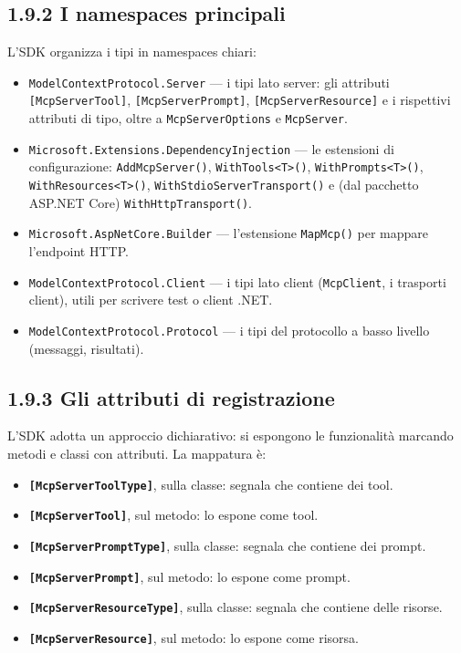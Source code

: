 \documentclass[
  italian,
  10pt,
]{book}
\providecommand{\tightlist}{%
  \setlength{\itemsep}{0pt}\setlength{\parskip}{0pt}}
\begin{document}
\subsection{1.9.2 I namespaces
principali}\label{i-namespaces-principali}

L'SDK organizza i tipi in namespaces chiari:

\begin{itemize}
\tightlist
\item
  \texttt{ModelContextProtocol.Server} --- i tipi lato server: gli
  attributi \texttt{{[}McpServerTool{]}},
  \texttt{{[}McpServerPrompt{]}}, \texttt{{[}McpServerResource{]}} e i
  rispettivi attributi di tipo, oltre a \texttt{McpServerOptions} e
  \texttt{McpServer}.
\item
  \texttt{Microsoft.Extensions.DependencyInjection} --- le estensioni di
  configurazione: \texttt{AddMcpServer()},
  \texttt{WithTools\textless{}T\textgreater{}()},
  \texttt{WithPrompts\textless{}T\textgreater{}()},
  \texttt{WithResources\textless{}T\textgreater{}()},
  \texttt{WithStdioServerTransport()} e (dal pacchetto ASP.NET Core)
  \texttt{WithHttpTransport()}.
\item
  \texttt{Microsoft.AspNetCore.Builder} --- l'estensione
  \texttt{MapMcp()} per mappare l'endpoint HTTP.
\item
  \texttt{ModelContextProtocol.Client} --- i tipi lato client
  (\texttt{McpClient}, i trasporti client), utili per scrivere test o
  client .NET.
\item
  \texttt{ModelContextProtocol.Protocol} --- i tipi del protocollo a
  basso livello (messaggi, risultati).
\end{itemize}

\subsection{1.9.3 Gli attributi di
registrazione}\label{gli-attributi-di-registrazione}

L'SDK adotta un approccio dichiarativo: si espongono le funzionalità
marcando metodi e classi con attributi. La mappatura è:

\begin{itemize}
\tightlist
\item
  \textbf{\texttt{{[}McpServerToolType{]}}}, sulla classe: segnala che
  contiene dei tool.
\item
  \textbf{\texttt{{[}McpServerTool{]}}}, sul metodo: lo espone come
  tool.
\item
  \textbf{\texttt{{[}McpServerPromptType{]}}}, sulla classe: segnala che
  contiene dei prompt.
\item
  \textbf{\texttt{{[}McpServerPrompt{]}}}, sul metodo: lo espone come
  prompt.
\item
  \textbf{\texttt{{[}McpServerResourceType{]}}}, sulla classe: segnala
  che contiene delle risorse.
\item
  \textbf{\texttt{{[}McpServerResource{]}}}, sul metodo: lo espone come
  risorsa.
\end{itemize}
\end{document}
